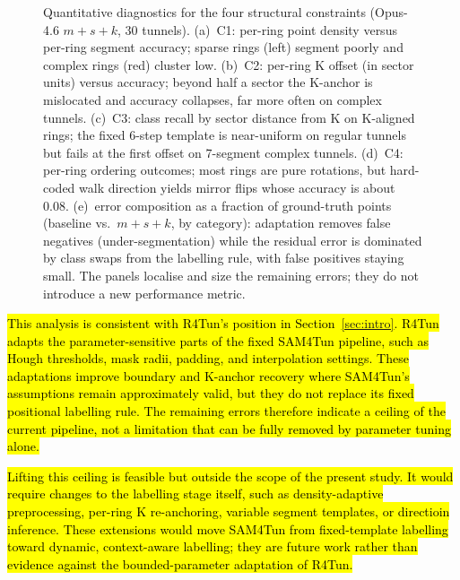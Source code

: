 \documentclass[a4paper,fleqn]{cas-dc}
\begin{document}
{%
\begin{figure}[t]
\centering
\caption{Quantitative diagnostics for the four structural constraints (Opus-4.6 \mbox{$m+s+k$}, 30 tunnels). (a)~C1: per-ring point density versus per-ring segment accuracy; sparse rings (left) segment poorly and complex rings (red) cluster low. (b)~C2: per-ring K offset (in sector units) versus accuracy; beyond half a sector the K-anchor is mislocated and accuracy collapses, far more often on complex tunnels. (c)~C3: class recall by sector distance from K on K-aligned rings; the fixed 6-step template is near-uniform on regular tunnels but fails at the first offset on 7-segment complex tunnels. (d)~C4: per-ring ordering outcomes; most rings are pure rotations, but hard-coded walk direction yields mirror flips whose accuracy is about 0.08. (e)~error composition as a fraction of ground-truth points (baseline vs.\ \mbox{\mbox{$m+s+k$}}, by category): adaptation removes false negatives (under-segmentation) while the residual error is dominated by class swaps from the labelling rule, with false positives staying small. The panels localise and size the remaining errors; they do not introduce a new performance metric.}
\label{fig:error-mechanism}
\end{figure}

\hl{This analysis is consistent with R4Tun's position in Section~\ref{sec:intro}. R4Tun adapts the parameter-sensitive parts of the fixed SAM4Tun pipeline, such as Hough thresholds, mask radii, padding, and interpolation settings. These adaptations improve boundary and K-anchor recovery where SAM4Tun's assumptions remain approximately valid, but they do not replace its fixed positional labelling rule. The remaining errors therefore indicate a ceiling of the current pipeline, not a limitation that can be fully removed by parameter tuning alone.}

\hl{Lifting this ceiling is feasible but outside the scope of the present study. It would require changes to the labelling stage itself, such as density-adaptive preprocessing, per-ring K re-anchoring, variable segment templates, or directioin inference. These extensions would move SAM4Tun from fixed-template labelling toward dynamic, context-aware labelling; they are future work rather than evidence against the bounded-parameter adaptation of R4Tun.}


}
\end{document}
